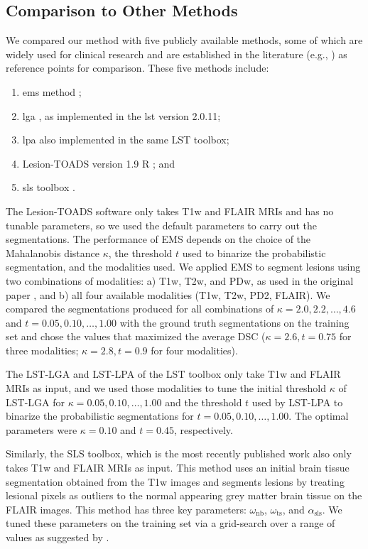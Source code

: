 \subsection[Comparison to other methods]{Comparison to Other Methods}
\label{sec:othermethods}

We compared our method with five publicly available methods, some of which
are widely used for clinical research and are established in the literature
(e.g., \citealp{sudre2015,subbanna2015,guizard2015}) as reference points for
comparison. These five methods include:
\begin{enumerate}
\item \Gls{ems} method \citep{vanleemput2001};
\item \Gls{lga} \citep{schmidt2012}, as
implemented in the \gls{lst} version 2.0.11;
\item \Gls{lpa} also implemented in the same LST toolbox;
\item Lesion-TOADS version 1.9 R \citep{shiee2010}; and 
\item \Gls{sls} toolbox \citep{roura2015}.
\end{enumerate}
The Lesion-TOADS software only takes T1w and FLAIR MRIs and has no tunable
parameters, so we used the default parameters to carry out the segmentations.
The performance of EMS depends on the choice of the Mahalanobis distance
$\kappa$, the threshold $t$ used to binarize the probabilistic segmentation, and
the modalities used. We applied EMS to segment lesions using two combinations of
modalities: a) T1w, T2w, and PDw, as used in the original paper
\citep{vanleemput2001}, and b) all four available modalities (T1w, T2w, PD2,
FLAIR). We compared the segmentations produced for all combinations of $\kappa =
2.0, 2.2, \dotsc, 4.6$ and $t = 0.05, 0.10, \dotsc, 1.00$ with the ground truth
segmentations on the training set and chose the values that maximized the
average DSC ($\kappa = 2.6, t = 0.75$ for three modalities; $\kappa = 2.8, t =
0.9$ for four modalities).

The LST-LGA and LST-LPA of the LST toolbox only take T1w and FLAIR MRIs as
input, and we used those modalities to tune the initial threshold $\kappa$ of
LST-LGA for $\kappa = 0.05, 0.10, \dotsc, 1.00$ and the threshold $t$ used by
LST-LPA to binarize the probabilistic segmentations for $t = 0.05, 0.10, \dotsc,
1.00$. The optimal parameters were $\kappa = 0.10$ and $t = 0.45$, respectively.

Similarly, the SLS toolbox, which is the most recently published work
\citep{roura2015} also only takes T1w and FLAIR MRIs as input. This method uses
an initial brain tissue segmentation obtained from the T1w images and segments
lesions by treating lesional pixels as outliers to the normal appearing grey
matter brain tissue on the FLAIR images. This method has three key parameters:
$\omega_\text{nb}$, $\omega_\text{ts}$, and $\alpha_\text{sls}$. We tuned these
parameters on the training set via a grid-search over a range of values as
suggested by \citet{roura2015}.

